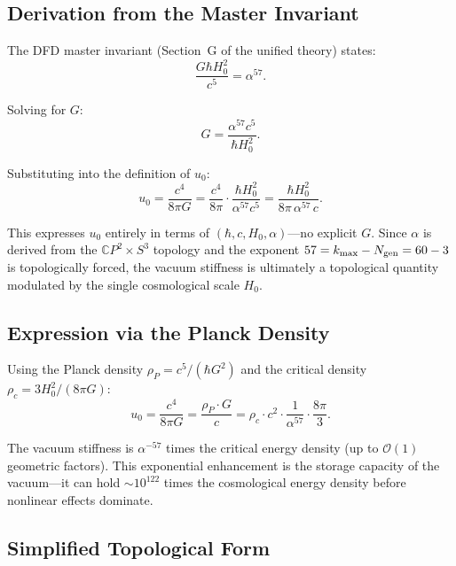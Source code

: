 \documentclass[11pt]{article}
\newcommand{\CP}{\mathbb{C}P}
\theoremstyle{plain}
\theoremstyle{definition}
\theoremstyle{remark}
\begin{document}
\subsection{Derivation from the Master Invariant}

The DFD master invariant (Section~G of the unified theory) states:
\begin{equation}
\frac{G\hbar H_0^2}{c^5} = \alpha^{57}.
\label{eq:master-invariant}
\end{equation}

Solving for $G$:
\begin{equation}
G = \frac{\alpha^{57} c^5}{\hbar H_0^2}.
\label{eq:G-from-invariant}
\end{equation}

Substituting into the definition of $u_0$:
\begin{equation}
u_0 = \frac{c^4}{8\pi G} = \frac{c^4}{8\pi} \cdot \frac{\hbar H_0^2}{\alpha^{57} c^5}
= \frac{\hbar H_0^2}{8\pi\,\alpha^{57}\,c}.
\label{eq:u0-from-invariant}
\end{equation}

This expresses $u_0$ entirely in terms of $(\hbar, c, H_0, \alpha)$---no
explicit $G$. Since $\alpha$ is derived from the $\CP^2 \times S^3$ topology
and the exponent $57 = k_{\max} - N_{\rm gen} = 60 - 3$ is topologically
forced, the vacuum stiffness is ultimately a topological quantity modulated
by the single cosmological scale $H_0$.

\subsection{Expression via the Planck Density}

Using the Planck density $\rho_P = c^5/(\hbar G^2)$ and the critical
density $\rho_c = 3H_0^2/(8\pi G)$:
\begin{equation}
u_0 = \frac{c^4}{8\pi G} = \frac{\rho_P \cdot G}{c}
= \rho_c \cdot c^2 \cdot \frac{1}{\alpha^{57}} \cdot \frac{8\pi}{3}.
\end{equation}

The vacuum stiffness is $\alpha^{-57}$ times the critical energy density
(up to $\mathcal{O}(1)$ geometric factors). This exponential enhancement
is the storage capacity of the vacuum---it can hold $\sim 10^{122}$ times
the cosmological energy density before nonlinear effects dominate.

\subsection{Simplified Topological Form}
\end{document}
